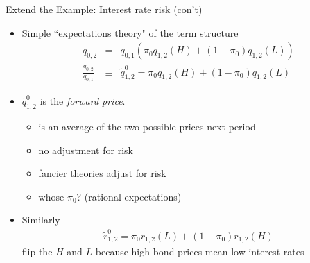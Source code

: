 \documentclass[professionalfonts,small]{beamer}
\begin{document}
\begin{frame}{Extend the Example: Interest rate risk (con't)}

\begin{itemize}
\footnotesize

\item Simple ``expectations theory" of the term structure
\begin{eqnarray*}
q_{0,2} &=& q_{0,1}(\pi_0 q_{1,2}(H) + (1-\pi_0) q_{1,2}(L)) \\
\frac{q_{0,2}}{q_{0,1}} &\equiv& \tilde{q}^0_{1,2} = \pi_0 q_{1,2}(H) + (1-\pi_0) q_{1,2}(L)
\end{eqnarray*}

\item $\tilde{q}^0_{1,2}$ is the {\em forward price}.
\begin{itemize}
\footnotesize
\item is an average of the two possible prices next period
\item no adjustment for risk
\item fancier theories adjust for risk
\item whose $\pi_0$? (rational expectations)
\end{itemize}

\item Similarly
\begin{eqnarray*}
\tilde{r}^0_{1,2} = \pi_0 r_{1,2}(L) + (1-\pi_0) r_{1,2}(H)
\end{eqnarray*}
flip the $H$ and $L$ because high bond prices mean low interest rates

\end{itemize}

\end{frame}
\end{document}
